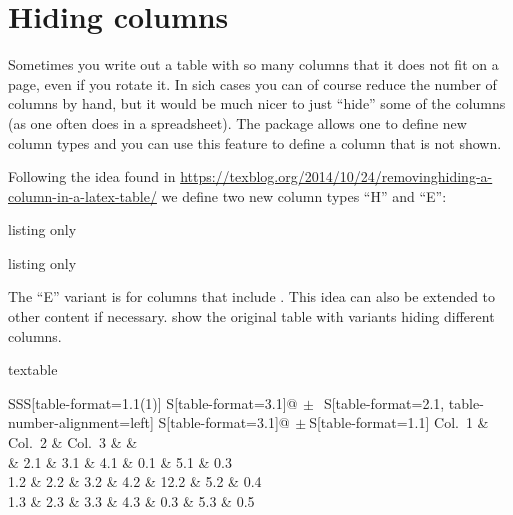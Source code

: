 \section{Hiding columns}
\label{sec:tab:hide}

Sometimes you write out a table with so many columns that it does not fit
on a page, even if you rotate it.
In sich cases you can of course reduce the number of columns by hand,
but it would be much nicer to just \enquote{hide} some of the columns
(as one often does in a spreadsheet).
The  package allows one to define new column types
and you can use this feature to define a column that is not shown.

Following the idea found in
\url{https://texblog.org/2014/10/24/removinghiding-a-column-in-a-latex-table/}
we define two new column types \enquote{H} and \enquote{E}:

\begin{tcblisting}{listing only}
\end{tcblisting}{listing only}

The \enquote{E} variant is for columns that include .
This idea can also be extended to other content if necessary.
 show the original table
with variants hiding different columns.

\begin{table}[htbp]
  \caption{Simple table with columns that we want to hide.}%
  \label{tab:column1}
\begin{tcblisting}{textable}
\centering
\begin{tabular}{SSS[table-format=1.1(1)]
  S[table-format=3.1]@{\(\,\pm\,\)}
  S[table-format=2.1, table-number-alignment=left]
  S[table-format=3.1]@{\(\,\pm\!\!\)}S[table-format=1.1]}
  \toprule
  {Col.\ 1} & {Col.\ 2} & {Col.\ 3} &
   &
   \\
   & 2.1 & 3.1  & 4.1 & 0.1 & 5.1 & 0.3 \\
  1.2 & 2.2 & 3.2  & 4.2 & 12.2 & 5.2 & 0.4 \\
  1.3 & 2.3 & 3.3  & 4.3 & 0.3 & 5.3 & 0.5\\
  \bottomrule
\end{tabular}
\end{tcblisting}
\end{table}

